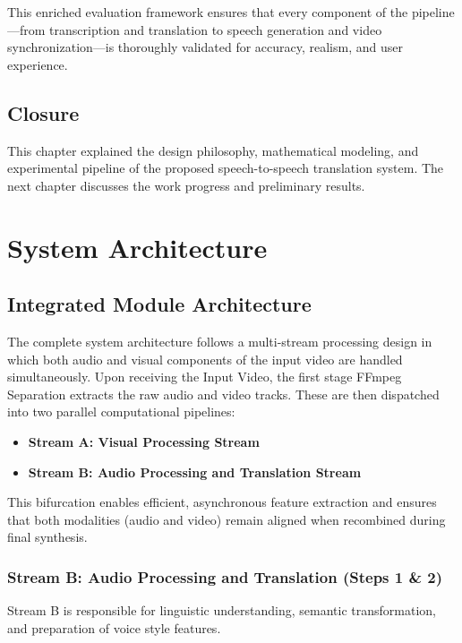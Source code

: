 \documentclass[12pt,oneside]{report}
\begin{document}
This enriched evaluation framework ensures that every component of the pipeline---from transcription and translation to speech generation and video synchronization---is thoroughly validated for accuracy, realism, and user experience.


\section{Closure}

This chapter explained the design philosophy, mathematical modeling, and experimental pipeline of the proposed speech-to-speech translation system. The next chapter discusses the work progress and preliminary results.

\chapter{System Architecture}
\label{ch:plan}

\section{Integrated Module Architecture}

The complete system architecture follows a multi-stream processing design in which both audio and visual components of the input video are handled simultaneously. Upon receiving the Input Video, the first stage FFmpeg Separation extracts the raw audio and video tracks. These are then dispatched into two parallel computational pipelines:

\begin{itemize}
    \item \textbf{Stream A: Visual Processing Stream}
    \item \textbf{Stream B: Audio Processing and Translation Stream}
\end{itemize}

This bifurcation enables efficient, asynchronous feature extraction and ensures that both modalities (audio and video) remain aligned when recombined during final synthesis.

\subsection{Stream B: Audio Processing and Translation (Steps 1 \& 2)}

Stream B is responsible for linguistic understanding, semantic transformation, and preparation of voice style features.
\end{document}
